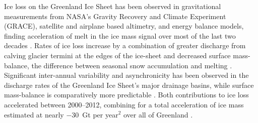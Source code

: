 \documentclass[11pt]{report}
\begin{document}
Ice loss on the Greenland Ice Sheet has been observed in
gravitational measurements from NASA's Gravity
Recovery and Climate Experiment (GRACE), satellite and airplane based
altimetry, and energy balance models, finding acceleration of melt in the ice mass signal over most of the last two decades \cite[][]{khan2015,Harig+2016}. Rates of ice loss increase by a
combination of greater discharge from calving glacier termini at the edges of
the ice-sheet and decreased surface mass-balance, the difference between
seasonal snow accumulation and melting \cite[][]{khan2015,enderlin2014}.
Significant inter-annual variability and asynchronicity has been observed in
the discharge rates of the Greenland Ice Sheet's major drainage basins, while
surface mass-balance is comparatively more predictable
\cite[][]{mcmillan2016,enderlin2014}. Both contributions to ice loss accelerated between 2000--2012, combining for a total acceleration of ice mass
estimated at nearly $-30$~Gt per year$^2$ over all of Greenland
\cite[][]{velicogna2009,enderlin2014,bevis2019}.
\end{document}
